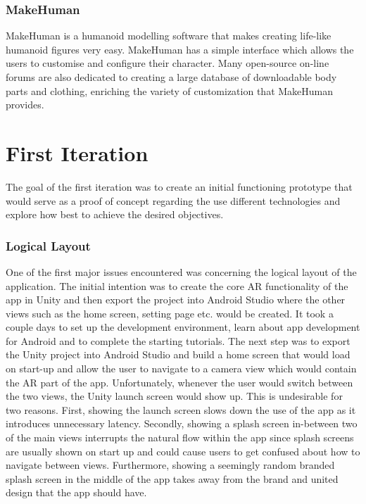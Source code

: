 \documentclass{l4proj}
\begin{document}
\subsubsection{MakeHuman}
MakeHuman\cite{makehuman_makehuman_nodate} is a humanoid modelling software that makes creating life-like humanoid figures very easy. MakeHuman has a simple interface which allows the users to customise and configure their character. Many open-source on-line forums are also dedicated to creating a large database of downloadable body parts and clothing, enriching the variety of customization that MakeHuman provides.

\section{First Iteration}
The goal of the first iteration was to create an initial functioning prototype that would serve as a proof of concept regarding the use different technologies and explore how best to achieve the desired objectives. 

\subsubsection{Logical Layout}
One of the first major issues encountered was concerning the logical layout of the application. The initial intention was to create the core AR functionality of the app in Unity and then export the project into Android Studio where the other views such as the home screen, setting page etc. would be created. It took a couple days to set up the development environment, learn about app development for Android and to complete the starting tutorials. The next step was to export the Unity project into Android Studio and build a home screen that would load on start-up and allow the user to navigate to a camera view which would contain the AR part of the app. Unfortunately, whenever the user would switch between the two views, the Unity launch screen would show up. This is undesirable for two reasons. First, showing the launch screen slows down the use of the app as it introduces unnecessary latency. Secondly, showing a splash screen in-between two of the main views interrupts the natural flow within the app since splash screens are usually shown on start up and could cause users to get confused about how to navigate between views. Furthermore, showing a seemingly random branded splash screen in the middle of the app takes away from the brand and united design that the app should have. 
\end{document}
